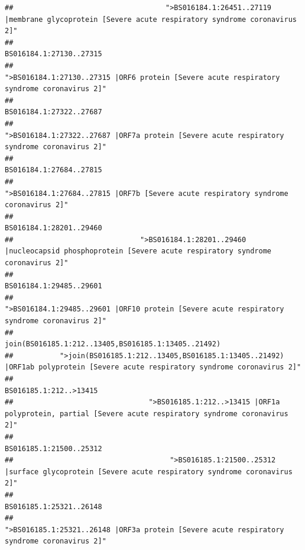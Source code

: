 \documentclass[
]{article}
\begin{document}
\begin{verbatim}
##                                    ">BS016184.1:26451..27119 |membrane glycoprotein [Severe acute respiratory syndrome coronavirus 2]" 
##                                                                                                                BS016184.1:27130..27315 
##                                             ">BS016184.1:27130..27315 |ORF6 protein [Severe acute respiratory syndrome coronavirus 2]" 
##                                                                                                                BS016184.1:27322..27687 
##                                            ">BS016184.1:27322..27687 |ORF7a protein [Severe acute respiratory syndrome coronavirus 2]" 
##                                                                                                                BS016184.1:27684..27815 
##                                                    ">BS016184.1:27684..27815 |ORF7b [Severe acute respiratory syndrome coronavirus 2]" 
##                                                                                                                BS016184.1:28201..29460 
##                              ">BS016184.1:28201..29460 |nucleocapsid phosphoprotein [Severe acute respiratory syndrome coronavirus 2]" 
##                                                                                                                BS016184.1:29485..29601 
##                                            ">BS016184.1:29485..29601 |ORF10 protein [Severe acute respiratory syndrome coronavirus 2]" 
##                                                                                    join(BS016185.1:212..13405,BS016185.1:13405..21492) 
##           ">join(BS016185.1:212..13405,BS016185.1:13405..21492) |ORF1ab polyprotein [Severe acute respiratory syndrome coronavirus 2]" 
##                                                                                                                 BS016185.1:212..>13415 
##                                ">BS016185.1:212..>13415 |ORF1a polyprotein, partial [Severe acute respiratory syndrome coronavirus 2]" 
##                                                                                                                BS016185.1:21500..25312 
##                                     ">BS016185.1:21500..25312 |surface glycoprotein [Severe acute respiratory syndrome coronavirus 2]" 
##                                                                                                                BS016185.1:25321..26148 
##                                            ">BS016185.1:25321..26148 |ORF3a protein [Severe acute respiratory syndrome coronavirus 2]" 

\end{verbatim}
\end{document}
